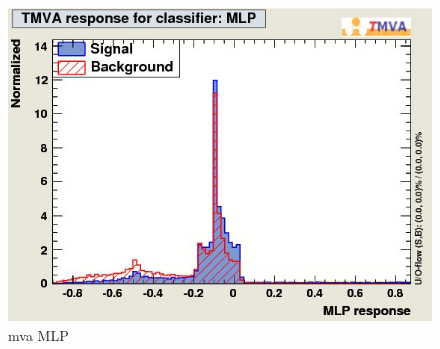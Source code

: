 \begin{figure}[h]
\begin{center}
\includegraphics[width=1.0\textwidth]{images/mva_MLP.jpg}
\caption{mva MLP}
\label{fig:mvamlp}
\end{center}
\end{figure}

